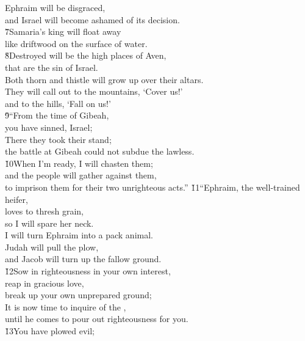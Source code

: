 \begin{poetry}
\poeml Ephraim will be disgraced, \\
\poemll    and Israel will become ashamed of its decision. \\
\poeml \v{7}Samaria's king will float away \\
\poemll    like driftwood on the surface of water. \\
\poeml \v{8}Destroyed will be the high places of Aven, \\
\poemll    that are the sin of Israel. \\
\poemlll       Both thorn and thistle will grow up over their altars. \\
\poeml They will call out to the mountains, `Cover us!' \\
\poemll    and to the hills, `Fall on us!' \\
\poeml \v{9}``From the time of Gibeah, \\
\poemll    you have sinned, Israel; \\
\poeml There they took their stand; \\
\poemll    the battle at Gibeah could not subdue the lawless. \\
\poeml \v{10}When I'm ready, I will chasten them; \\
\poemll    and the people will gather against them, \\
\poemlll       to imprison them for their two unrighteous acts.''
\poeml \v{11}``Ephraim, the well-trained heifer, \\
\poemll    loves to thresh grain, \\
\poeml so I will spare her neck. \\
\poemll    I will turn Ephraim into a pack animal. \\
\poeml Judah will pull the plow, \\
\poemll    and Jacob will turn up the fallow ground. \\
\poeml \v{12}Sow in righteousness in your own interest, \\
\poemll    reap in gracious love, \\
\poemlll       break up your own unprepared ground; \\
\poeml It is now time to inquire of the , \\
\poemll    until he comes to pour out righteousness for you. \\
\poeml \v{13}You have plowed evil; \\

\end{poetry}
